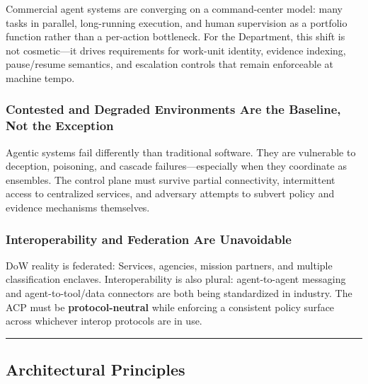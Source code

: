 \documentclass[11pt]{article}
\begin{document}
Commercial agent systems are converging on a command-center model: many
tasks in parallel, long-running execution, and human supervision as a
portfolio function rather than a per-action bottleneck. For the
Department, this shift is not cosmetic---it drives requirements for
work-unit identity, evidence indexing, pause/resume semantics, and
escalation controls that remain enforceable at machine tempo.

\hypertarget{contested-and-degraded-environments-are-the-baseline-not-the-exception}{%
\subsubsection{Contested and Degraded Environments Are the Baseline, Not the Exception}\label{contested-and-degraded-environments-are-the-baseline-not-the-exception}}

Agentic systems fail differently than traditional software. They are
vulnerable to deception, poisoning, and cascade failures---especially
when they coordinate as ensembles. The control plane must survive
partial connectivity, intermittent access to centralized services, and
adversary attempts to subvert policy and evidence mechanisms themselves.

\hypertarget{interoperability-and-federation-are-unavoidable}{%
\subsubsection{Interoperability and Federation Are Unavoidable}\label{interoperability-and-federation-are-unavoidable}}

DoW reality is federated: Services, agencies, mission partners, and
multiple classification enclaves. Interoperability is also plural:
agent-to-agent messaging and agent-to-tool/data connectors are both
being standardized in industry. The ACP must be
\textbf{protocol-neutral} while enforcing a consistent policy surface
across whichever interop protocols are in use.

\vspace{2pt}\begin{center}\rule{0.62\linewidth}{0.6pt}\end{center}\vspace{2pt}

\hypertarget{architectural-principles}{%
\subsection{Architectural Principles}\label{architectural-principles}}
\end{document}
